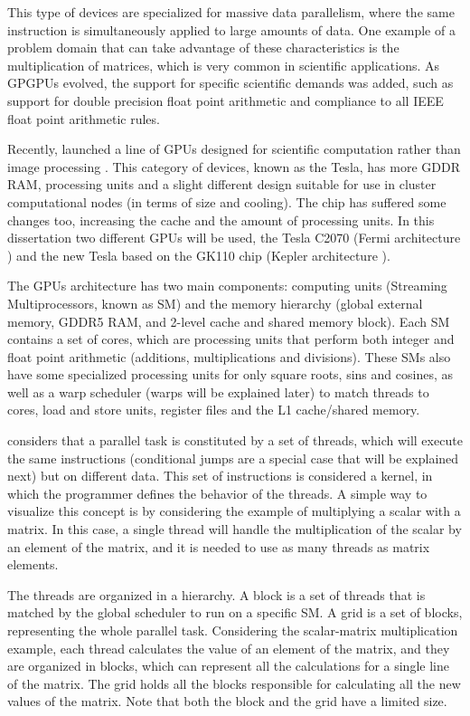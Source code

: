 This type of devices are specialized for massive data parallelism, where the same instruction is simultaneously applied to large amounts of data. One example of a problem domain that can take advantage of these characteristics is the multiplication of matrices, which is very common in scientific applications. As GPGPUs evolved, the support for specific scientific demands was added, such as support for double precision float point arithmetic and compliance to all IEEE float point arithmetic rules.

Recently, \nvidia \cite{NVIDIA} launched a line of GPUs designed for scientific computation rather than image processing \cite{NVIDIA:Tesla}. This category of devices, known as the Tesla, has more GDDR RAM, processing units and a slight different design suitable for use in cluster computational nodes (in terms of size and cooling). The chip has suffered some changes too, increasing the cache and the amount of processing units. In this dissertation two different \nvidia GPUs will be used, the \nvidia Tesla C2070 (Fermi architecture \cite{NVIDIA:Fermi}) and the new \nvidia Tesla based on the GK110 chip (Kepler architecture \cite{NVIDIA:Kepler}).

The \nvidia GPUs architecture has two main components: computing units (Streaming Multiprocessors, known as SM) and the memory hierarchy (global external memory, GDDR5 RAM, and 2-level cache and shared memory block). Each SM contains a set of \cuda cores, which are processing units that perform both integer and float point arithmetic (additions, multiplications and divisions). These SMs also have some specialized processing units for only square roots, sins and cosines, as well as a warp scheduler (warps will be explained later) to match \cuda threads to \cuda cores, load and store units, register files and the L1 cache/shared memory.

\nvidia considers that a parallel task is constituted by a set of \cuda threads, which will execute the same instructions (conditional jumps are a special case that will be explained next) but on different data. This set of instructions is considered a \cuda kernel, in which the programmer defines the behavior of the \cuda threads. A simple way to visualize this concept is by considering the example of multiplying a scalar with a matrix. In this case, a single thread will handle the multiplication of the scalar by an element of the matrix, and it is needed to use as many \cuda threads as matrix elements.

The \cuda threads are organized in a hierarchy. A block is a set of \cuda threads that is matched by the global scheduler to run on a specific SM. A grid is a set of blocks, representing the whole parallel task. Considering the scalar-matrix multiplication example, each \cuda thread calculates the value of an element of the matrix, and they are organized in blocks, which can represent all the calculations for a single line of the matrix. The grid holds all the blocks responsible for calculating all the new values of the matrix. Note that both the block and the grid have a limited size.

